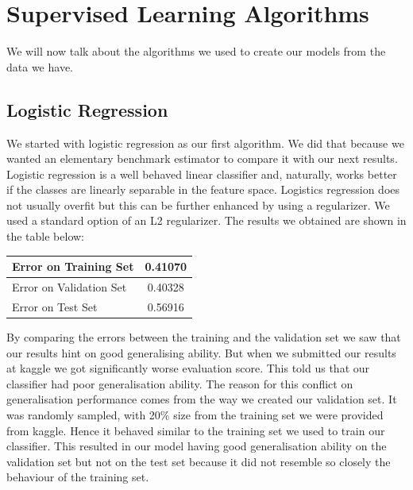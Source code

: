 \documentclass[conference, onecolumn]{IEEEtran}
\begin{document}

\section{Supervised Learning Algorithms}

We will now talk about the algorithms we used to create our models from the data we have.


\subsection{Logistic Regression}

We started with logistic regression as our first algorithm. We did that because we wanted an elementary benchmark estimator to compare it with our next results. Logistic regression is a well behaved linear classifier and, naturally, works better if the classes are linearly separable in the feature space. Logistics regression does not usually overfit but this can be further enhanced by using a regularizer. We used a standard option of an L2 regularizer. The results we obtained are shown in the table below:
\begin{center}
\begin{tabular}{ |l|c| } 
\hline
Error on Training Set & 0.41070  \\ \hline
Error on Validation Set & 0.40328 \\ \hline
Error on Test Set & 0.56916\\ \hline
\end{tabular}
\end{center}
By comparing the errors between the training and the validation set we saw that our results hint on good generalising ability. But when we submitted our results at kaggle we got significantly worse evaluation score. This told us that our classifier had poor generalisation ability. The reason for this conflict on generalisation performance comes from the way we created our validation set. It was randomly sampled, with 20\% size from the training set we were provided from kaggle. Hence it behaved similar to the training set we used to train our classifier. This resulted in our model having good generalisation ability on the validation set but not on the test set because it did not resemble so closely the behaviour of the training set.
\end{document}
